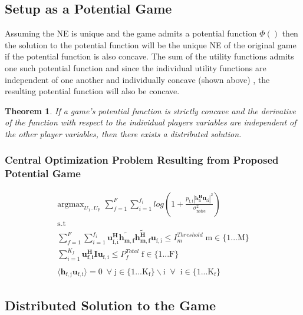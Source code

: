 \documentclass[12pt]{article}
\newtheorem{theorem}{Theorem}
\begin{document}
\subsection{Setup as a Potential Game}
Assuming the NE is unique and the game admits a potential function $\Phi()$ then the solution to the potential function will be the unique NE of the original game if the potential function is also concave. 
The sum of the utility functions admits one such potential function and since the individual utility functions are independent of one another and individually concave (shown above) , the resulting potential function will also be concave. 
\\
\begin{theorem}\label{distributed}
If a game's potential function is strictly concave and the derivative of the function with respect to the individual players variables are independent of the other player variables, then there exists a distributed solution.
\end{theorem}
\subsubsection{Central Optimization Problem Resulting from Proposed Potential Game}

\begin{gather}\label{potential_game}
\mathrm{argmax}_{U_{\mathrm{1}}.. U_{\mathrm{F}}}
\;
\sum_{f=1}^F
\sum_{i=1}^{f_i}
log(1+\frac{p_{ \mathrm{f,i}}|\mathbf{h^H_{\mathrm{fi}}u_{ \mathrm{fi}}}|^2}{\sigma^2_{ \mathrm{noise}} })
\\
\mathrm{s.t}
\\
\sum_{f=1}^F
\sum_{i=1}^{f_i}
\mathbf{u_{ \mathrm{f,i}}^H} \mathbf{\tilde{h_{m,f}}} \mathbf{\tilde{h_{m,f}^H}} \mathbf{u_{\mathrm{f,i}}} \leq I^{Threshold}_{m} \;  \mathrm{m} \in  \mathrm{\{1 ... M\}}
\\
\sum_{i=1}^{K_f}\mathbf{u_{f,i}^H} \mathbf{I} \mathbf{u_{\mathrm{f,i}}} \leq  P^{Total}_{f}
\; \mathrm{f} \in \mathrm{\{1 ... F\}}
\\
\\
\langle \mathbf{h_{\mathrm{f,j}}}\mathbf{u_{\mathrm{f,i}}} \rangle =0\ \; \forall \; \mathrm{j \in \{1 ... K_f\}\backslash i \;\; 
}
\forall \;\;\mathrm{ i \in \{1 ... K_f\}}
\end{gather}



\subsection{Distributed Solution to the Game}
\end{document}
